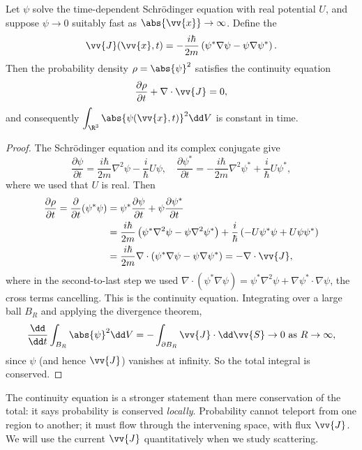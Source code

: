 \begin{theorem}
    Let $\psi$ solve the time-dependent Schr\"odinger equation with real potential $U$, and suppose $\psi \rightarrow 0$ suitably fast as $\abs{\vv{x}} \rightarrow \infty$. Define the 
    $$
    \vv{J}(\vv{x}, t) = -\frac{i \hbar}{2m} \left( \psi^* \nabla \psi - \psi \nabla \psi^* \right).
    $$
    Then the probability density $\rho = \abs{\psi}^2$ satisfies the continuity equation
    $$
    \frac{\partial \rho}{\partial t} + \nabla \cdot \vv{J} = 0,
    $$
    and consequently $\displaystyle \int_{\R^3} \abs{\psi(\vv{x},t)}^2 \dd V$ is constant in time.
\end{theorem}
\begin{proof}
    The Schr\"odinger equation and its complex conjugate give
    $$
    \frac{\partial \psi}{\partial t} = \frac{i \hbar}{2m} \nabla^2 \psi - \frac{i}{\hbar} U \psi, \quad
    \frac{\partial \psi^*}{\partial t} = -\frac{i \hbar}{2m} \nabla^2 \psi^* + \frac{i}{\hbar} U \psi^*,
    $$
    where we used that $U$ is real. Then
    \begin{align*}
        \frac{\partial \rho}{\partial t} = \frac{\partial}{\partial t} (\psi^* \psi)
        &= \psi^* \frac{\partial \psi}{\partial t} + \psi \frac{\partial \psi^*}{\partial t} \\
        &= \frac{i\hbar}{2m} \left( \psi^* \nabla^2 \psi - \psi \nabla^2 \psi^* \right) + \frac{i}{\hbar}\left(- U \psi^* \psi + U \psi \psi^* \right)\\
        &= \frac{i\hbar}{2m} \nabla \cdot \left( \psi^* \nabla \psi - \psi \nabla \psi^* \right) = -\nabla \cdot \vv{J},
    \end{align*}
    where in the second-to-last step we used $\nabla \cdot (\psi^* \nabla \psi) = \psi^* \nabla^2 \psi + \nabla \psi^* \cdot \nabla \psi$, the cross terms cancelling. This is the continuity equation. Integrating over a large ball $B_R$ and applying the divergence theorem,
    $$
    \frac{\dd}{\dd t} \int_{B_R} \abs{\psi}^2 \dd V = -\int_{\partial B_R} \vv{J} \cdot \dd \vv{S} \rightarrow 0 \text{ as } R \rightarrow \infty,
    $$
    since $\psi$ (and hence $\vv{J}$) vanishes at infinity. So the total integral is conserved.
\end{proof}

The continuity equation is a stronger statement than mere conservation of the total: it says probability is conserved \emph{locally}. Probability cannot teleport from one region to another; it must flow through the intervening space, with flux $\vv{J}$. We will use the current $\vv{J}$ quantitatively when we study scattering.

